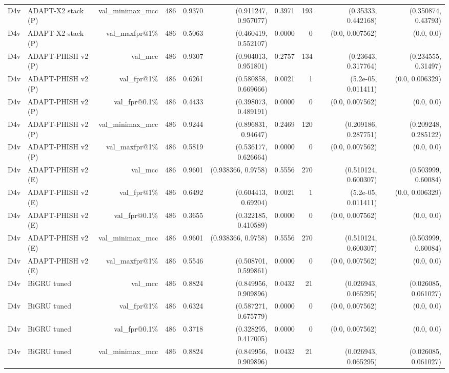 \begin{table}[t]
\begin{tabular}{llrrrrrrrr}
D4v & ADAPT-X2 stack (P) & val\_minimax\_mcc & 486 & 0.9370 & (0.911247, 0.957077) & 0.3971 & 193 & (0.35333, 0.442168) & (0.350874, 0.43793) \\
D4v & ADAPT-X2 stack (P) & val\_maxfpr@1\% & 486 & 0.5063 & (0.460419, 0.552107) & 0.0000 & 0 & (0.0, 0.007562) & (0.0, 0.0) \\
D4v & ADAPT-PHISH v2 (P) & val\_mcc & 486 & 0.9307 & (0.904013, 0.951801) & 0.2757 & 134 & (0.23643, 0.317764) & (0.234555, 0.31497) \\
D4v & ADAPT-PHISH v2 (P) & val\_fpr@1\% & 486 & 0.6261 & (0.580858, 0.669666) & 0.0021 & 1 & (5.2e-05, 0.011411) & (0.0, 0.006329) \\
D4v & ADAPT-PHISH v2 (P) & val\_fpr@0.1\% & 486 & 0.4433 & (0.398073, 0.489191) & 0.0000 & 0 & (0.0, 0.007562) & (0.0, 0.0) \\
D4v & ADAPT-PHISH v2 (P) & val\_minimax\_mcc & 486 & 0.9244 & (0.896831, 0.94647) & 0.2469 & 120 & (0.209186, 0.287751) & (0.209248, 0.285122) \\
D4v & ADAPT-PHISH v2 (P) & val\_maxfpr@1\% & 486 & 0.5819 & (0.536177, 0.626664) & 0.0000 & 0 & (0.0, 0.007562) & (0.0, 0.0) \\
D4v & ADAPT-PHISH v2 (E) & val\_mcc & 486 & 0.9601 & (0.938366, 0.9758) & 0.5556 & 270 & (0.510124, 0.600307) & (0.503999, 0.60084) \\
D4v & ADAPT-PHISH v2 (E) & val\_fpr@1\% & 486 & 0.6492 & (0.604413, 0.69204) & 0.0021 & 1 & (5.2e-05, 0.011411) & (0.0, 0.006329) \\
D4v & ADAPT-PHISH v2 (E) & val\_fpr@0.1\% & 486 & 0.3655 & (0.322185, 0.410589) & 0.0000 & 0 & (0.0, 0.007562) & (0.0, 0.0) \\
D4v & ADAPT-PHISH v2 (E) & val\_minimax\_mcc & 486 & 0.9601 & (0.938366, 0.9758) & 0.5556 & 270 & (0.510124, 0.600307) & (0.503999, 0.60084) \\
D4v & ADAPT-PHISH v2 (E) & val\_maxfpr@1\% & 486 & 0.5546 & (0.508701, 0.599861) & 0.0000 & 0 & (0.0, 0.007562) & (0.0, 0.0) \\
D4v & BiGRU tuned & val\_mcc & 486 & 0.8824 & (0.849956, 0.909896) & 0.0432 & 21 & (0.026943, 0.065295) & (0.026085, 0.061027) \\
D4v & BiGRU tuned & val\_fpr@1\% & 486 & 0.6324 & (0.587271, 0.675779) & 0.0000 & 0 & (0.0, 0.007562) & (0.0, 0.0) \\
D4v & BiGRU tuned & val\_fpr@0.1\% & 486 & 0.3718 & (0.328295, 0.417005) & 0.0000 & 0 & (0.0, 0.007562) & (0.0, 0.0) \\
D4v & BiGRU tuned & val\_minimax\_mcc & 486 & 0.8824 & (0.849956, 0.909896) & 0.0432 & 21 & (0.026943, 0.065295) & (0.026085, 0.061027) \\

\end{tabular}
\end{table}
